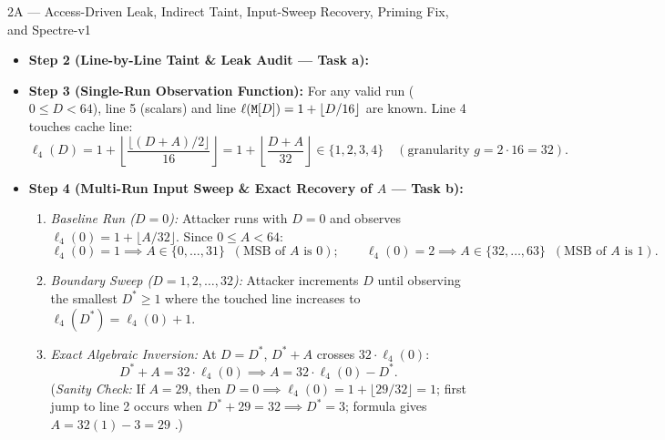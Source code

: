 \begin{templatebox}{2A --- Access-Driven Leak, Indirect Taint, Input-Sweep Recovery, Priming Fix, and Spectre-v1}
\begin{itemize}
  \item \textbf{Step 2 (Line-by-Line Taint \& Leak Audit --- Task a):}

  \item \textbf{Step 3 (Single-Run Observation Function):}
  For any valid run ($0 \le D < 64$), line 5 (scalars) and line $\ell(\texttt{M}[D]) = 1 + \lfloor D/16 \rfloor$ are known. Line 4 touches cache line:
  \[
    \ell_4(D) = 1 + \left\lfloor \frac{\lfloor (D + A)/2 \rfloor}{16} \right\rfloor = 1 + \left\lfloor \frac{D + A}{32} \right\rfloor \in \{1, 2, 3, 4\} \quad (\text{granularity } g = 2 \cdot 16 = 32).
  \]

  \item \textbf{Step 4 (Multi-Run Input Sweep \& Exact Recovery of $A$ --- Task b):}
  \begin{enumerate}[label=\arabic*., leftmargin=1.5em]
    \item \emph{Baseline Run ($D = 0$):} Attacker runs with $D = 0$ and observes $\ell_4(0) = 1 + \lfloor A/32 \rfloor$. Since $0 \le A < 64$:
    \[
      \ell_4(0) = 1 \implies A \in \{0, \dots, 31\} \;\; (\text{MSB of } A \text{ is } 0); \qquad \ell_4(0) = 2 \implies A \in \{32, \dots, 63\} \;\; (\text{MSB of } A \text{ is } 1).
    \]
    \item \emph{Boundary Sweep ($D = 1, 2, \dots, 32$):} Attacker increments $D$ until observing the smallest $D^* \ge 1$ where the touched line increases to $\ell_4(D^*) = \ell_4(0) + 1$.
    \item \emph{Exact Algebraic Inversion:} At $D = D^*$, $D^* + A$ crosses $32 \cdot \ell_4(0)$:
    \[
      D^* + A = 32 \cdot \ell_4(0) \implies A = 32 \cdot \ell_4(0) - D^*.
    \]
    (\emph{Sanity Check:} If $A = 29$, then $D=0 \implies \ell_4(0) = 1 + \lfloor 29/32 \rfloor = 1$; first jump to line 2 occurs when $D^* + 29 = 32 \implies D^* = 3$; formula gives $A = 32(1) - 3 = 29$ \checkmark.)
  \end{enumerate}


\end{itemize}
\end{templatebox}
